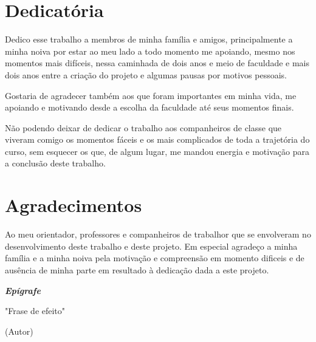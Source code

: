\documentclass[brazil,ruledheader]{abntifes}
\begin{document}
\chapter*{Dedicatória}
    Dedico esse trabalho a membros de minha família e amigos, principalmente a minha noiva por estar ao meu lado a todo momento me apoiando, mesmo nos momentos mais difíceis, nessa caminhada de dois anos e meio de faculdade e mais dois anos entre a criação do projeto e algumas pausas por motivos pessoais.

    Gostaria de agradecer também aos que foram importantes em minha vida, me apoiando e motivando desde a escolha da faculdade até seus momentos finais.

    Não podendo deixar de dedicar o trabalho aos companheiros de classe que viveram comigo os momentos fáceis e os mais complicados de toda a trajetória do curso, sem esquecer os que, de algum lugar, me mandou energia e motivação para a conclusão deste trabalho.


\chapter*{Agradecimentos}
    Ao meu orientador, professores e companheiros de trabalhor que se envolveram no desenvolvimento deste trabalho e deste projeto. Em especial agradeço a minha família e a minha noiva pela motivação e compreensão em momento dificeis e de ausência de minha parte em resultado à dedicação dada a este projeto.
\vfill
\null

\begin{center}
{\Huge {\bfseries\itshape Epígrafe}}\\[3cm]
\vspace{15cm}
\end{center}

\begin{espacoduplo}
\end{espacoduplo}

\epigraph{"Frase de efeito"}{(Autor)}
\end{document}
